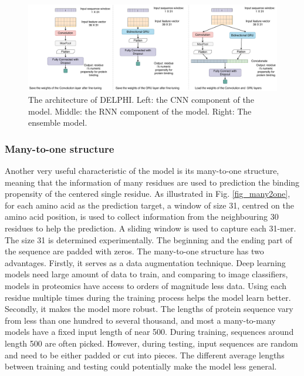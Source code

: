 \begin{figure}
\centering
\includegraphics[width=\textwidth]{img/Model_architecture.pdf}
\caption{The architecture of DELPHI. Left: the CNN component of the model. Middle: the RNN component of the model. Right: The ensemble model. 
  \label{fig_architecture}}
\end{figure}
\subsubsection{Many-to-one structure}
Another very useful characteristic of the model is its many-to-one structure, meaning that the information of many residues are used to prediction the binding propensity of the centered single residue. As illustrated in Fig. \ref{fig_many2one}, for each amino acid as the prediction target, a window of size 31, centred on the amino acid position, is used to collect information from the neighbouring 30 residues to help the prediction. A sliding window is used to capture each 31-mer. The size 31 is determined experimentally. The beginning and the ending part of the sequence are padded with zeros. The many-to-one structure has two advantages. Firstly, it serves as a data augmentation technique. Deep learning models need large amount of data to train, and comparing to image classifiers, models in proteomics have access to orders of magnitude less data. Using each residue multiple times during the training process helps the model learn better. Secondly, it makes the model more robust. The lengths of protein sequence vary from less than one hundred to several thousand, and most a many-to-many models have a fixed input length of near 500. During training, sequences around length 500 are often picked. However, during testing, input sequences are random and need to be either padded or cut into pieces. The different average lengths between training and testing could potentially make the model less general. 
